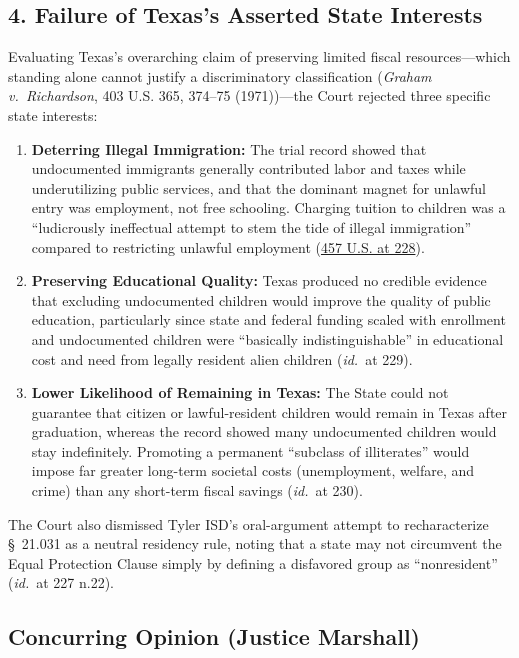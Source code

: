 \documentclass[12pt]{article}
\begin{document}
\subsection*{4. Failure of Texas's Asserted State Interests}
Evaluating Texas's overarching claim of preserving limited fiscal resources---which standing alone cannot justify a discriminatory classification (\textit{Graham v.\ Richardson}, 403 U.S. 365, 374--75 (1971))---the Court rejected three specific state interests:
\begin{enumerate}
    \item \textbf{Deterring Illegal Immigration:} The trial record showed that undocumented immigrants generally contributed labor and taxes while underutilizing public services, and that the dominant magnet for unlawful entry was employment, not free schooling. Charging tuition to children was a ``ludicrously ineffectual attempt to stem the tide of illegal immigration'' compared to restricting unlawful employment (\href{https://www.law.cornell.edu/supremecourt/text/457/202}{457 U.S. at 228}).
    \item \textbf{Preserving Educational Quality:} Texas produced no credible evidence that excluding undocumented children would improve the quality of public education, particularly since state and federal funding scaled with enrollment and undocumented children were ``basically indistinguishable'' in educational cost and need from legally resident alien children (\textit{id.}\ at 229).
    \item \textbf{Lower Likelihood of Remaining in Texas:} The State could not guarantee that citizen or lawful-resident children would remain in Texas after graduation, whereas the record showed many undocumented children would stay indefinitely. Promoting a permanent ``subclass of illiterates'' would impose far greater long-term societal costs (unemployment, welfare, and crime) than any short-term fiscal savings (\textit{id.}\ at 230).
\end{enumerate}

The Court also dismissed Tyler ISD's oral-argument attempt to recharacterize \S~21.031 as a neutral residency rule, noting that a state may not circumvent the Equal Protection Clause simply by defining a disfavored group as ``nonresident'' (\textit{id.}\ at 227 n.22).

\subsection{Concurring Opinion (Justice Marshall)}
\end{document}

